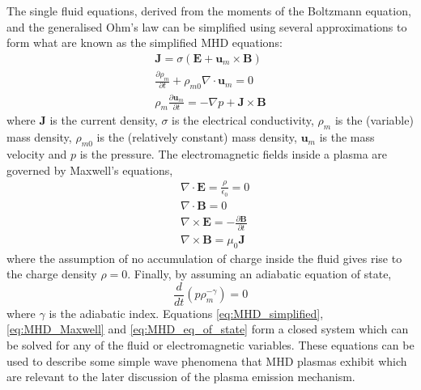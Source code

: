 The single fluid equations, derived from the moments of the Boltzmann equation, and the generalised Ohm's law can be simplified using several approximations to form what are known as the simplified MHD equations:
\begin{subequations} \label{eq:MHD_simplified}
\begin{align}
\mathbf{J} = \sigma(\mathbf{E} + \mathbf{u}_m \times \mathbf{B}) \\
\frac{\partial \rho_m}{\partial t} + \rho_{m0} \nabla \cdot \mathbf{u}_m = 0 \\
\rho_m \frac{\partial \mathbf{u}_m}{\partial t} = - \nabla p + \mathbf{J} \times \mathbf{B}
\end{align}
\end{subequations}
where $\mathbf{J}$ is the current density, $\sigma$ is the electrical conductivity, $\rho_m$ is the (variable) mass density, $\rho_{m0}$ is the (relatively constant) mass density,  $\mathbf{u}_m$ is the mass velocity and $p$ is the pressure.
The electromagnetic fields inside a plasma are governed by Maxwell's equations,
\begin{subequations} \label{eq:MHD_Maxwell}
\begin{align}
& \nabla \cdot \mathbf{E} = \frac{\rho}{\epsilon_0} = 0 \\
& \nabla \cdot \mathbf{B} = 0 \\
& \nabla \times \mathbf{E} = - \frac{\partial \mathbf{B}}{\partial t} \\
& \nabla \times \mathbf{B} = \mu_0 \mathbf{J}
\end{align}
\end{subequations}
where the assumption of no accumulation of charge inside the fluid gives rise to the charge density $\rho = 0$. Finally, by assuming an adiabatic equation of state,
\begin{equation}
\label{eq:MHD_eq_of_state}
\frac{d}{dt} \left(p \rho_m^{-\gamma} \right) = 0
\end{equation}
where $\gamma $ is the adiabatic index.
Equations \ref{eq:MHD_simplified}, \ref{eq:MHD_Maxwell} and \ref{eq:MHD_eq_of_state} form a closed system which can be solved for any of the fluid or electromagnetic variables. These equations can be used to describe some simple wave phenomena that MHD plasmas exhibit which are relevant to the later discussion of the plasma emission mechanism.
